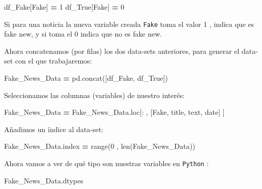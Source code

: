 \documentclass[
  11pt,
  a4paper,
]{article}
\newenvironment{Shaded}{\begin{snugshade}}{\end{snugshade}}
\newcommand{\BuiltInTok}[1]{#1}
\newcommand{\DecValTok}[1]{\textcolor[rgb]{0.00,0.00,0.81}{#1}}
\newcommand{\NormalTok}[1]{#1}
\newcommand{\OperatorTok}[1]{\textcolor[rgb]{0.81,0.36,0.00}{\textbf{#1}}}
\newcommand{\StringTok}[1]{\textcolor[rgb]{0.31,0.60,0.02}{#1}}
\begin{document}
\begin{Shaded}
\begin{Highlighting}[]
\NormalTok{df\_Fake[}\StringTok{\textquotesingle{}Fake\textquotesingle{}}\NormalTok{] }\OperatorTok{=} \DecValTok{1}
\NormalTok{df\_True[}\StringTok{\textquotesingle{}Fake\textquotesingle{}}\NormalTok{] }\OperatorTok{=} \DecValTok{0}
\end{Highlighting}
\end{Shaded}

Si para una noticia la nueva variable creada \texttt{Fake} toma el valor
1 , indica que es fake new, y si toma el 0 indica que no es fake new.

Ahora concatenamos (por filas) los dos data-sets anteriores, para
generar el data-set con el que trabajaremos:

\begin{Shaded}
\begin{Highlighting}[]
\NormalTok{Fake\_News\_Data }\OperatorTok{=}\NormalTok{ pd.concat([df\_Fake, df\_True])}
\end{Highlighting}
\end{Shaded}

Seleccionamos las columnas (variables) de nuestro interés:

\begin{Shaded}
\begin{Highlighting}[]
\NormalTok{Fake\_News\_Data }\OperatorTok{=}\NormalTok{ Fake\_News\_Data.loc[: , [}\StringTok{\textquotesingle{}Fake\textquotesingle{}}\NormalTok{, }\StringTok{\textquotesingle{}title\textquotesingle{}}\NormalTok{, }\StringTok{\textquotesingle{}text\textquotesingle{}}\NormalTok{, }\StringTok{\textquotesingle{}date\textquotesingle{}}\NormalTok{] ]}
\end{Highlighting}
\end{Shaded}

Añadimos un índice al data-set:

\begin{Shaded}
\begin{Highlighting}[]
\NormalTok{Fake\_News\_Data.index }\OperatorTok{=} \BuiltInTok{range}\NormalTok{(}\DecValTok{0}\NormalTok{ , }\BuiltInTok{len}\NormalTok{(Fake\_News\_Data))}
\end{Highlighting}
\end{Shaded}

Ahora vamos a ver de qué tipo son nuestras variables en \texttt{Python}
:

\begin{Shaded}
\begin{Highlighting}[]
\NormalTok{Fake\_News\_Data.dtypes}
\end{Highlighting}
\end{Shaded}
\end{document}
